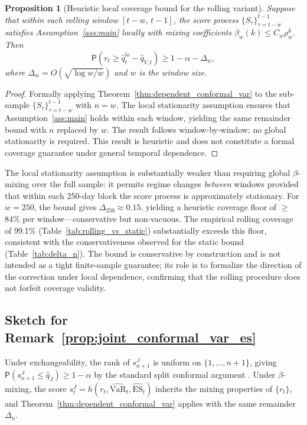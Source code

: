 \documentclass[preprint,11pt,authoryear]{elsarticle}
\newtheorem{proposition}[theorem]{Proposition}
\newcommand{\VaR}{\mathrm{VaR}}
\newcommand{\ES}{\mathrm{ES}}
\renewcommand{\P}{\mathsf{P}}
\newcommand{\1}{\boldsymbol{1}}
\begin{document}
	\begin{proposition}[Heuristic local coverage bound for the rolling variant]
		\label{prop:rolling_coverage}
		Suppose that within each rolling window $[t-w,\, t-1]$, the
		score process $\{S_\tau\}_{\tau=t-w}^{t-1}$ satisfies
		Assumption~\ref{ass:main} locally with mixing coefficients
		$\beta_w(k) \leq C_w \rho_w^k$. Then
		\[
		\P\!\left(r_t \geq \hat{q}_t^{lo} - \hat{q}_{V,t}\right)
		\geq 1 - \alpha - \Delta_w,
		\]
		where $\Delta_w = O(\sqrt{\log w / w})$ and $w$ is the window
		size.
	\end{proposition}

	\begin{proof}
		Formally applying Theorem~\ref{thm:dependent_conformal_var} to the
		sub-sample $\{S_\tau\}_{\tau=t-w}^{t-1}$ with $n = w$. The
		local stationarity assumption ensures that
		Assumption~\ref{ass:main} holds within each window, yielding
		the same remainder bound with $n$ replaced by $w$. The result
		follows window-by-window; no global stationarity is required.
		This result is heuristic and does not constitute a formal coverage guarantee under general temporal dependence.
	\end{proof}

	The local stationarity assumption is substantially weaker than
	requiring global $\beta$-mixing over the full sample: it permits
	regime changes \emph{between} windows provided that within each
	250-day block the score process is approximately stationary.
	For $w = 250$, the bound gives $\Delta_{250} \approx 0.15$,
	yielding a heuristic coverage floor of $\geq$84\% per window---conservative but
	non-vacuous. The empirical rolling coverage of 99.1\%
	(Table~\ref{tab:rolling_vs_static}) substantially exceeds this
	floor, consistent with the conservativeness observed for the
	static bound (Table~\ref{tab:delta_n}).
	The bound is conservative by construction and is not intended as a tight finite-sample guarantee; its role is to formalize the direction of the correction under local dependence, confirming that the rolling procedure does not forfeit coverage validity.

	\subsection{Sketch for Remark~\ref{prop:joint_conformal_var_es}}
	
	Under exchangeability, the rank of $s_{n+1}^J$ is uniform on $\{1,\ldots,n+1\}$, giving $\P(s_{n+1}^J \le \hat{q}_J) \geq 1 - \alpha$ by the standard split conformal argument \citep{vovk2005algorithmic}. Under $\beta$-mixing, the score $s_t^J = h(r_t, \widehat{\VaR}_t, \widehat{\ES}_t)$ inherits the mixing properties of $\{r_t\}$, and Theorem~\ref{thm:dependent_conformal_var} applies with the same remainder $\Delta_n$.
	
\end{document}
